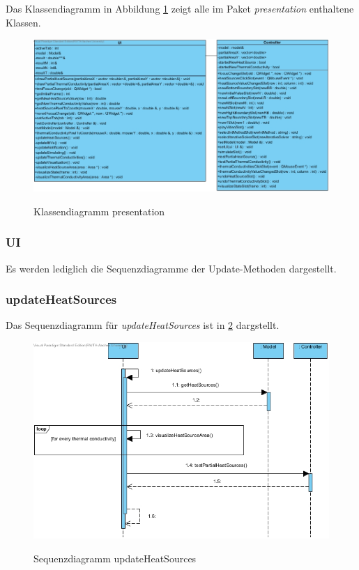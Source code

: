 Das Klassendiagramm in Abbildung \ref{Klassendiagramm presentation} zeigt alle im Paket \emph{presentation} enthaltene Klassen.

\begin{figure}[H]
	\centering
	\includegraphics[scale=.9]{Bilder/presentation.jpg}\\
	\caption{Klassendiagramm presentation}
	\label{Klassendiagramm presentation}
\end{figure}

\subsubsection{UI}

Es werden lediglich die Sequenzdiagramme der Update-Methoden dargestellt.

\subsubsection*{updateHeatSources}

Das Sequenzdiagramm für \emph{updateHeatSources} ist in \ref{Sequenzdiagramm updateHeatSources} dargstellt.

\begin{figure}[H]
	\centering
	\includegraphics[scale=.6]{Bilder/UI__updateHeatSources().jpg}\\
	\caption{Sequenzdiagramm updateHeatSources}
	\label{Sequenzdiagramm updateHeatSources}
\end{figure}

